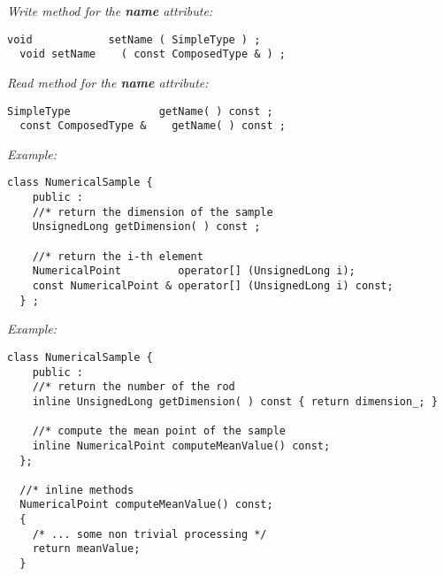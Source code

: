 
\emph{Write method for the {\bf name} attribute:}
\lstset{language=C++, basicstyle=\normalsize}
\begin{lstlisting}[frame=TBRL]
  void            setName ( SimpleType ) ;
  void setName    ( const ComposedType & ) ;
\end{lstlisting}
\emph{Read method for the {\bf name} attribute:}
\lstset{language=C++, basicstyle=\normalsize}
\begin{lstlisting}[frame=TBRL]
  SimpleType              getName( ) const ;
  const ComposedType &    getName( ) const ;
\end{lstlisting}
\emph{Example:}
\lstset{language=C++, basicstyle=\normalsize}
\begin{lstlisting}[frame=TBRL]
  class NumericalSample {
    public :
    //* return the dimension of the sample
    UnsignedLong getDimension( ) const ;

    //* return the i-th element
    NumericalPoint         operator[] (UnsignedLong i);
    const NumericalPoint & operator[] (UnsignedLong i) const;
  } ;
\end{lstlisting}


\emph{Example:}
\lstset{language=C++, basicstyle=\normalsize}
\begin{lstlisting}[frame=TBRL]
  class NumericalSample {
    public :
    //* return the number of the rod
    inline UnsignedLong getDimension( ) const { return dimension_; }

    //* compute the mean point of the sample
    inline NumericalPoint computeMeanValue() const;
  };

  //* inline methods
  NumericalPoint computeMeanValue() const;
  {
    /* ... some non trivial processing */
    return meanValue;
  }
\end{lstlisting}


